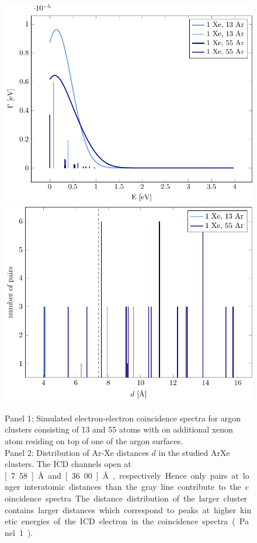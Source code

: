 \begin{figure}[h]
 \centering
 \includegraphics[scale=0.7]{pics/surf.pdf}\\
 \includegraphics[scale=0.7]{pics/R_comp.pdf}
 \caption{Panel 1: Simulated electron-electron coincidence spectra
          for argon clusters
          consisting of 13 and 55 atoms with on additional xenon atom residing
          on top of one of the argon surfaces.\\
          Panel 2: Distribution of Ar-Xe distances $d$ in the studied ArXe
          clusters. The ICD channels open at \unit[7.58]{\AA} and
          \unit[36.00]{\AA}, respectively. Hence only pairs at longer interatomic
          distances than the gray line contribute to the coincidence spectra.
          The distance distribution of the larger cluster contains larger
          distances which correspond to peaks at higher kinetic energies of
          the ICD electron in the coincidence spectra (Panel 1).}
 \label{figure:surf}
\end{figure}



